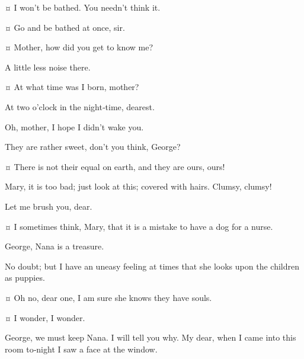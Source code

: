 \begin{drama}
\johnspeaks {}¤
I won’t be bathed.
You needn’t think it.

\mrdarlingspeaks {}¤
Go and be bathed at once, sir.


\michaelspeaks {}¤
Mother, how did you get to know me?

\mrdarlingspeaks
A little less noise there.

\michaelspeaks {}¤
At what time was I born, mother?

\mrsdarlingspeaks
At two o’clock in the night‐time, dearest.

\michaelspeaks
Oh, mother, I hope I didn’t wake you.

\mrsdarlingspeaks
They are rather sweet, don’t you think, George?

\mrdarlingspeaks {}¤
There is not their equal on earth, and they are ours, ours!


\mrdarlingspeaks
Mary, it is too bad; just look at this; covered with hairs.
Clumsy, clumsy!


\mrsdarlingspeaks
Let me brush you, dear.


\mrdarlingspeaks {}¤
I sometimes think, Mary, that it is a mistake to have a dog for a nurse.

\mrsdarlingspeaks
George, Nana is a treasure.

\mrdarlingspeaks
No doubt; but I have an uneasy feeling at times that she looks upon the children as puppies.

\mrsdarlingspeaks {}¤
Oh no, dear one, I am sure she knows they have souls.

\mrdarlingspeaks {}¤
I wonder, I wonder.


\mrsdarlingspeaks
George, we must keep Nana.
I will tell you why.
My dear, when I came into this room to‐night I saw a face at the window.


\end{drama}
